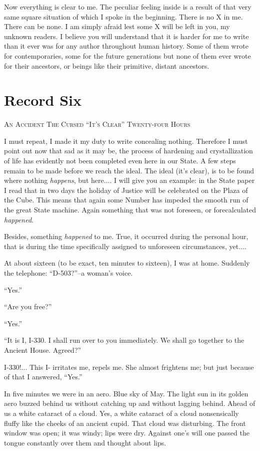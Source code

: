 \documentclass[11pt,openany]{book}
\newcommand{\bookchapterplain}[1]{%
  \clearpage\phantomsection
  \chapter*{#1}%
  \addcontentsline{toc}{chapter}{#1}%
  \markboth{#1}{#1}\thispagestyle{plain}}
\begin{document}
Now everything is clear to me. The peculiar feeling inside is a result of that very same square situation of which I spoke in the beginning. There is no X in me. There can be none. I am simply afraid lest some X will be left in you, my unknown readers. I believe you will understand that it is harder for me to write than it ever was for any author throughout human history. Some of them wrote for contemporaries, some for the future generations but none of them ever wrote for their ancestors, or beings like their primitive, distant ancestors.

\bookchapterplain{Record Six}

\begin{center}\textsc{An Accident The Cursed ``It's Clear'' Twenty-four Hours}\end{center}

I must repeat, I made it my duty to write concealing nothing. Therefore I must point out now that sad as it may be, the process of hardening and crystallization of life has evidently not been completed even here in our State. A few steps remain to be made before we reach the ideal. The ideal (it's clear), is to be found where nothing \emph{happens}, but here.... I will give you an example: in the State paper I read that in two days the holiday of Justice will be celebrated on the Plaza of the Cube. This means that again some Number has impeded the smooth run of the great State machine. Again something that was not foreseen, or forecalculated \emph{happened}.

Besides, something \emph{happened} to me. True, it occurred during the personal hour, that is during the time specifically assigned to unforeseen circumstances, yet....

At about sixteen (to be exact, ten minutes to sixteen), I was at home. Suddenly the telephone: ``D-503?''--a woman's voice.

``Yes.''

``Are you free?''

``Yes.''

``It is I, I-330. I shall run over to you immediately. We shall go together to the Ancient House. Agreed?''

I-330!... This I- irritates me, repels me. She almost frightens me; but just because of that I answered, ``Yes.''

In five minutes we were in an aero. Blue sky of May. The light sun in its golden aero buzzed behind us without catching up and without lagging behind. Ahead of us a white cataract of a cloud. Yes, a white cataract of a cloud nonsensically fluffy like the cheeks of an ancient cupid. That cloud was disturbing. The front window was open; it was windy; lips were dry. Against one's will one passed the tongue constantly over them and thought about lips.
\end{document}

